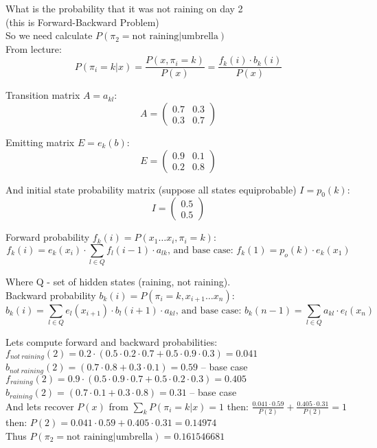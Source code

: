 \documentclass{article}
\begin{document}
What is the probability that it was not raining on day 2\\
(this is Forward-Backward Problem)\\

So we need calculate $P(\pi_2=\text{not raining}|\text{umbrella})$\\

From lecture:\\

$$
P(\pi_i=k|x) = \frac{P(x, \pi_i=k)}{P(x)} = \frac{f_k(i) \cdot b_k(i)}{P(x)}
$$

Transition matrix $A = a_{kl}$:
$$
A =
\begin{pmatrix}
  0.7 & 0.3 \\ 0.3 & 0.7
\end{pmatrix}
$$

Emitting matrix $E = e_k(b)$:
$$
E =
\begin{pmatrix}
  0.9 & 0.1 \\ 0.2 & 0.8
\end{pmatrix}
$$

And initial state probability matrix (suppose all states equiprobable) $I=p_0(k)$:
$$
I =
\begin{pmatrix}
  0.5 \\ 0.5 
\end{pmatrix}
$$

Forward probability $f_k(i) = P(x_1 \dots x_i, \pi_i=k)$:
$$
f_k(i) = e_k(x_i) \cdot \sum_{l \in Q}{f_l(i-1) \cdot a_{lk}}
\text{, and base case: }
f_k(1) = p_o(k) \cdot e_k(x_1)
$$

Where Q - set of hidden states (raining, not raining).\\

Backward probability $b_k(i) = P(\pi_i=k, x_{i+1} \dots x_n)$:
$$
b_k(i) = \sum_{l \in Q}{e_l(x_{i+1}) \cdot b_l(i+1) \cdot a_{kl}}
\text{, and base case: }
b_k(n-1) = \sum_{l \in Q}{a_{kl} \cdot e_l(x_n)}
$$

Lets compute forward and backward probabilities:\\

$ f_{not \ raining}(2) = 0.2 \cdot (0.5 \cdot 0.2 \cdot 0.7 + 0.5 \cdot 0.9
\cdot 0.3) = 0.041 $\\
$ b_{not \ raining}(2) = (0.7 \cdot 0.8 + 0.3 \cdot 0.1) = 0.59$
{\color{black!40} -- base case}\\

$ f_{raining}(2) = 0.9 \cdot (0.5 \cdot 0.9 \cdot 0.7 + 0.5 \cdot 0.2
\cdot 0.3) = 0.405$\\
$ b_{raining}(2) = (0.7 \cdot 0.1 + 0.3 \cdot 0.8) = 0.31$
{\color{black!40} -- base case}\\

And lets recover $P(x)$ from
$\sum_{k}{P(\pi_i=k|x)} = 1$
then:
$\frac{0.041 \cdot 0.59}{P(2)} + \frac{0.405 \cdot 0.31}{P(2)} = 1$\\
then:
$P(2) = 0.041 \cdot 0.59 + 0.405 \cdot 0.31 = 0.14974$\\

Thus
$P(\pi_2 = \text{not raining} | \text{umbrella}) = 0.161546681$
\end{document}
